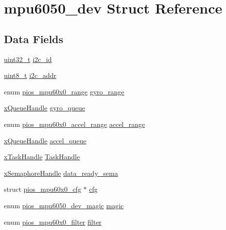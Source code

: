 \hypertarget{structmpu6050__dev}{\section{mpu6050\-\_\-dev Struct Reference}
\label{structmpu6050__dev}
}
\subsection*{Data Fields}
\begin{DoxyCompactItemize}
\item 
\hyperlink{stdint_8h_a435d1572bf3f880d55459d9805097f62}{uint32\-\_\-t} \hyperlink{structmpu6050__dev_ac0c61d2a2005659c182ca98984b49dd1}{i2c\-\_\-id}
\item 
\hyperlink{stdint_8h_aba7bc1797add20fe3efdf37ced1182c5}{uint8\-\_\-t} \hyperlink{structmpu6050__dev_a62f37e4827ac7856727a18e7cc6a252d}{i2c\-\_\-addr}
\item 
enum \hyperlink{group___p_i_o_s___m_p_u60_x0_ga56700b0154a14cf67c9f8f44a86ad9c0}{pios\-\_\-mpu60x0\-\_\-range} \hyperlink{structmpu6050__dev_aaf65682756b6135dbeb042934660076a}{gyro\-\_\-range}
\item 
\hyperlink{_common_2_libraries_2_free_r_t_o_s_2_source_2include_2queue_8h_a229037f755b756156e34a440ce134b8b}{x\-Queue\-Handle} \hyperlink{structmpu6050__dev_a91859d6141bf6c0d8dc50d144339baab}{gyro\-\_\-queue}
\item 
enum \hyperlink{group___p_i_o_s___m_p_u60_x0_ga8f297bddae3eb43bbf7b54abc6494992}{pios\-\_\-mpu60x0\-\_\-accel\-\_\-range} \hyperlink{structmpu6050__dev_a4733a0f3b1d592d6858902c3f12cf3b2}{accel\-\_\-range}
\item 
\hyperlink{_common_2_libraries_2_free_r_t_o_s_2_source_2include_2queue_8h_a229037f755b756156e34a440ce134b8b}{x\-Queue\-Handle} \hyperlink{structmpu6050__dev_a59bba40f73e989c812d988c7c1e8a8bc}{accel\-\_\-queue}
\item 
\hyperlink{_common_2_libraries_2_free_r_t_o_s_2_source_2include_2task_8h_a271ae40d5db07d928a113766505a0965}{x\-Task\-Handle} \hyperlink{structmpu6050__dev_ae7f409a90546c5e2c100212a0bd63d94}{Task\-Handle}
\item 
\hyperlink{_common_2_libraries_2_free_r_t_o_s_2_source_2include_2semphr_8h_aa91aa1b6835a184838f9ccf138a6ad10}{x\-Semaphore\-Handle} \hyperlink{structmpu6050__dev_ad4d0a233a1d6f73d37c88f646dd36e3f}{data\-\_\-ready\-\_\-sema}
\item 
struct \hyperlink{structpios__mpu60x0__cfg}{pios\-\_\-mpu60x0\-\_\-cfg} $\ast$ \hyperlink{structmpu6050__dev_ac1b0d1da5fdfa6488dd23aa964573496}{cfg}
\item 
enum \hyperlink{group___p_i_o_s___m_p_u6050_ga22a9ad4120542ed164b6afe9b094b6f3}{pios\-\_\-mpu6050\-\_\-dev\-\_\-magic} \hyperlink{structmpu6050__dev_acc91a02bd2c3ea3808aa09d4358d56ea}{magic}
\item 
enum \hyperlink{group___p_i_o_s___m_p_u60_x0_gacce1988bc994f5ade6ac748c2bf0b924}{pios\-\_\-mpu60x0\-\_\-filter} \hyperlink{structmpu6050__dev_ac959727d047bc26d53673d376f76f8bc}{filter}
\end{DoxyCompactItemize}


